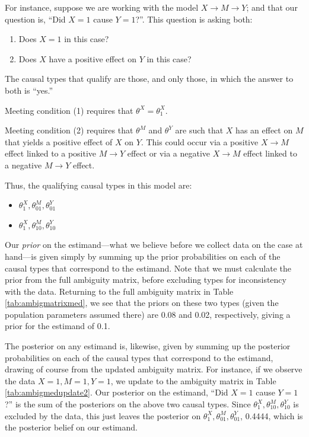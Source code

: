 \documentclass[12pt,]{book}
\providecommand{\tightlist}{%
  \setlength{\itemsep}{0pt}\setlength{\parskip}{0pt}}
\begin{document}
For instance, suppose we are working with the model \(X \rightarrow M \rightarrow Y\); and that our question is, ``Did \(X=1\) cause \(Y=1\)?''. This question is asking both:

\begin{enumerate}
\def\labelenumi{\arabic{enumi}.}
\item
  Does \(X=1\) in this case?
\item
  Does \(X\) have a positive effect on \(Y\) in this case?
\end{enumerate}

The causal types that qualify are those, and only those, in which the answer to both is ``yes.''

Meeting condition (1) requires that \(\theta^X=\theta^X_1\).

Meeting condition (2) requires that \(\theta^M\) and \(\theta^Y\) are such that \(X\) has an effect on \(M\) that yields a positive effect of \(X\) on \(Y\). This could occur via a positive \(X \rightarrow M\) effect linked to a positive \(M \rightarrow Y\) effect or via a negative \(X \rightarrow M\) effect linked to a negative \(M \rightarrow Y\) effect.

Thus, the qualifying causal types in this model are:

\begin{itemize}
\tightlist
\item
  \(\theta^X_1, \theta^M_{01}, \theta^Y_{01}\)
\item
  \(\theta^X_1, \theta^M_{10}, \theta^Y_{10}\)
\end{itemize}

Our \emph{prior} on the estimand---what we believe before we collect data on the case at hand---is given simply by summing up the prior probabilities on each of the causal types that correspond to the estimand. Note that we must calculate the prior from the full ambiguity matrix, before excluding types for inconsistency with the data. Returning to the full ambiguity matrix in Table \ref{tab:ambigmatrixmed}, we see that the priors on these two types (given the population parameters assumed there) are 0.08 and 0.02, respectively, giving a prior for the estimand of 0.1.

The posterior on any estimand is, likewise, given by summing up the posterior probabilities on each of the causal types that correspond to the estimand, drawing of course from the updated ambiguity matrix. For instance, if we observe the data \(X=1, M=1, Y=1\), we update to the ambiguity matrix in Table \ref{tab:ambigmedupdate2}. Our posterior on the estimand, ``Did \(X=1\) cause \(Y=1\)?'' is the sum of the posteriors on the above two causal types. Since \(\theta^X_1, \theta^M_{10}, \theta^Y_{10}\) is excluded by the data, this just leaves the posterior on \(\theta^X_1, \theta^M_{01}, \theta^Y_{01}\), 0.4444, which is the posterior belief on our estimand.
\end{document}
